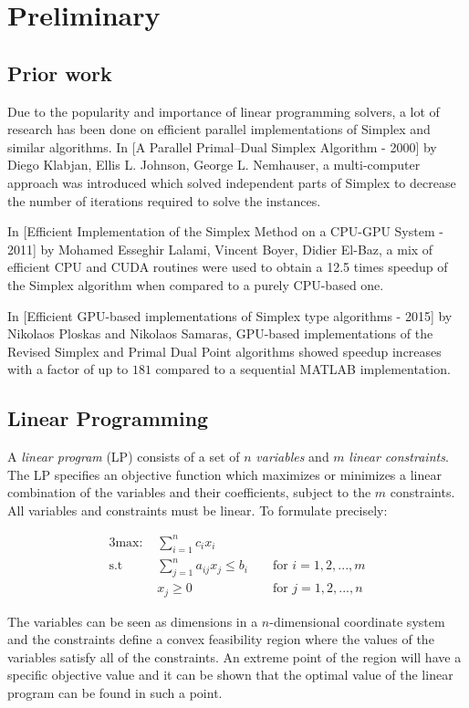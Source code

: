 \section{Preliminary}
\subsection{Prior work}
Due to the popularity and importance of linear programming solvers, a lot of research has been done on efficient parallel implementations of Simplex and similar algorithms. In [A Parallel Primal–Dual Simplex Algorithm - 2000] by Diego Klabjan, Ellis L. Johnson, George L. Nemhauser, a multi-computer approach was introduced which solved independent parts of Simplex to decrease the number of iterations required to solve the instances.

In [Efficient Implementation of the Simplex Method on a CPU-GPU System - 2011] by Mohamed Esseghir Lalami, Vincent Boyer, Didier El-Baz, a mix of efficient CPU and CUDA routines were used to obtain a 12.5 times speedup of the Simplex algorithm when compared to a purely CPU-based one.

In [Efficient GPU-based implementations of Simplex type algorithms - 2015] by Nikolaos Ploskas and Nikolaos Samaras, GPU-based implementations of the Revised Simplex and Primal Dual Point algorithms showed speedup increases with a factor of up to $181$ compared to a sequential MATLAB implementation.

\subsection{Linear Programming}
A \textit{linear program} (LP) consists of a set of $n$ \textit{variables} and $m$ \textit{linear constraints}. The LP specifies an objective function which maximizes or minimizes a linear combination of the variables and their coefficients, subject to the $m$ constraints. All variables and constraints must be linear. To formulate precisely:

\begin{alignat*}{3}
\text{max: } &\sum_{i=1}^{n} c_i x_i\\
\text{s.t }  & \sum_{j=1}^{n} a_{ij} x_j \leq b_i && \text{ for } i=1,2,...,m\\
& x_j \geq 0                         && \text{ for } j=1,2,...,n
\end{alignat*}

The variables can be seen as dimensions in a $n$-dimensional coordinate system and the constraints define a convex feasibility region where the values of the variables satisfy all of the constraints. An extreme point of the region will have a specific objective value and it can be shown that the optimal value of the linear program can be found in such a point.

